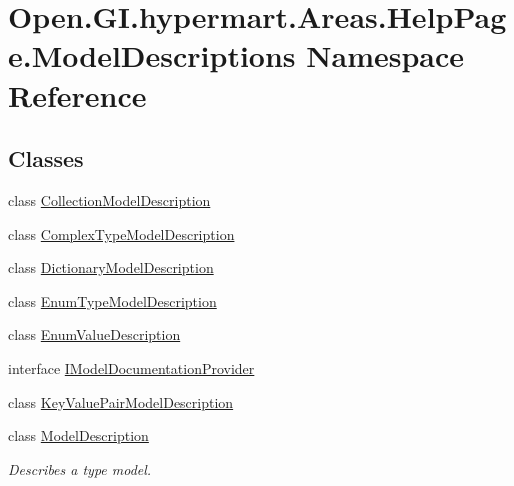 \hypertarget{namespace_open_1_1_g_i_1_1hypermart_1_1_areas_1_1_help_page_1_1_model_descriptions}{}\section{Open.\+G\+I.\+hypermart.\+Areas.\+Help\+Page.\+Model\+Descriptions Namespace Reference}
\label{namespace_open_1_1_g_i_1_1hypermart_1_1_areas_1_1_help_page_1_1_model_descriptions}
\subsection*{Classes}
\begin{DoxyCompactItemize}
\item 
class \hyperlink{class_open_1_1_g_i_1_1hypermart_1_1_areas_1_1_help_page_1_1_model_descriptions_1_1_collection_model_description}{Collection\+Model\+Description}
\item 
class \hyperlink{class_open_1_1_g_i_1_1hypermart_1_1_areas_1_1_help_page_1_1_model_descriptions_1_1_complex_type_model_description}{Complex\+Type\+Model\+Description}
\item 
class \hyperlink{class_open_1_1_g_i_1_1hypermart_1_1_areas_1_1_help_page_1_1_model_descriptions_1_1_dictionary_model_description}{Dictionary\+Model\+Description}
\item 
class \hyperlink{class_open_1_1_g_i_1_1hypermart_1_1_areas_1_1_help_page_1_1_model_descriptions_1_1_enum_type_model_description}{Enum\+Type\+Model\+Description}
\item 
class \hyperlink{class_open_1_1_g_i_1_1hypermart_1_1_areas_1_1_help_page_1_1_model_descriptions_1_1_enum_value_description}{Enum\+Value\+Description}
\item 
interface \hyperlink{interface_open_1_1_g_i_1_1hypermart_1_1_areas_1_1_help_page_1_1_model_descriptions_1_1_i_model_documentation_provider}{I\+Model\+Documentation\+Provider}
\item 
class \hyperlink{class_open_1_1_g_i_1_1hypermart_1_1_areas_1_1_help_page_1_1_model_descriptions_1_1_key_value_pair_model_description}{Key\+Value\+Pair\+Model\+Description}
\item 
class \hyperlink{class_open_1_1_g_i_1_1hypermart_1_1_areas_1_1_help_page_1_1_model_descriptions_1_1_model_description}{Model\+Description}
\begin{DoxyCompactList}\small\item\em Describes a type model. \end{DoxyCompactList}\item 

\end{DoxyCompactItemize}
